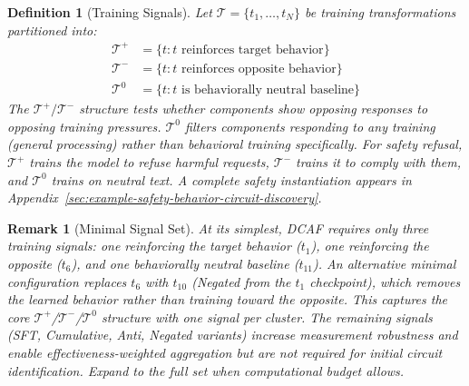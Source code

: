 \documentclass[11pt]{article}
\newtheorem{definition}{Definition}[section]
\newtheorem{remark}{Remark}[section]
\begin{document}
\begin{definition}[Training Signals]
\label{def:training-signals}
Let $\mathcal{T} = \{t_1, \ldots, t_N\}$ be training transformations partitioned into:
\begin{align}
\mathcal{T}^+ &= \{t : t \text{ reinforces target behavior}\} \\
\mathcal{T}^- &= \{t : t \text{ reinforces opposite behavior}\} \\
\mathcal{T}^0 &= \{t : t \text{ is behaviorally neutral baseline}\}
\end{align}
The $\mathcal{T}^+/\mathcal{T}^-$ structure tests whether components show opposing responses to opposing training pressures. $\mathcal{T}^0$ filters components responding to any training (general processing) rather than behavioral training specifically. For safety refusal, $\mathcal{T}^+$ trains the model to refuse harmful requests, $\mathcal{T}^-$ trains it to comply with them, and $\mathcal{T}^0$ trains on neutral text. A complete safety instantiation appears in Appendix~\ref{sec:example-safety-behavior-circuit-discovery}.
\end{definition}

\begin{remark}[Minimal Signal Set]
\label{rem:minimal-signal-set}
At its simplest, DCAF requires only three training signals: one reinforcing the target behavior ($t_1$), one reinforcing the opposite ($t_6$), and one behaviorally neutral baseline ($t_{11}$). An alternative minimal configuration replaces $t_6$ with $t_{10}$ (Negated from the $t_1$ checkpoint), which removes the learned behavior rather than training toward the opposite. This captures the core $\mathcal{T}^+$/$\mathcal{T}^-$/$\mathcal{T}^0$ structure with one signal per cluster. The remaining signals (SFT, Cumulative, Anti, Negated variants) increase measurement robustness and enable effectiveness-weighted aggregation but are not required for initial circuit identification. Expand to the full set when computational budget allows.
\end{remark}
\end{document}
